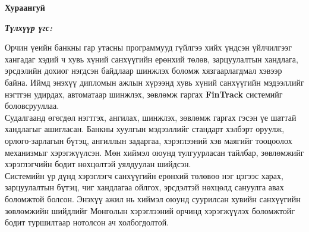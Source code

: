 

\begin{center}
{\scshape\Large \univname\par}
{\scshape\large \facname\par}\vspace{0.5cm}
{\huge\textbf{{Хураангуй}} \par}
\bigskip
{\Large{\ttitle} \par}
\bigskip

{\normalsize \shortname \par}
\addressname
\end{center}

\textit{\textbf{Түлхүүр үгс: \keywordnames}}
\bigskip

Орчин үеийн банкны гар утасны программууд гүйлгээ хийх үндсэн үйлчилгээг хангадаг хэдий ч хувь хүний санхүүгийн ерөнхий төлөв, зарцуулалтын хандлага, эрсдэлийн дохиог нэгдсэн байдлаар шинжлэх боломж хязгаарлагдмал хэвээр байна. Иймд энэхүү дипломын ажлын хүрээнд хувь хүний санхүүгийн мэдээллийг нэгтгэн удирдах, автоматаар шинжлэх, зөвлөмж гаргах \textbf{FinTrack} системийг боловсрууллаа.\\

Судалгаанд өгөгдөл нэгтгэх, ангилах, шинжлэх, зөвлөмж гаргах гэсэн үе шаттай хандлагыг ашигласан. Банкны хуулгын мэдээллийг стандарт хэлбэрт оруулж, орлого-зарлагын бүтэц, ангиллын задаргаа, хэрэглээний хэв маягийг тооцоолох механизмыг хэрэгжүүлсэн. Мөн хиймэл оюунд тулгуурласан тайлбар, зөвлөмжийг хэрэглэгчийн бодит нөхцөлтэй уялдуулан шийдсэн.\\

Системийн үр дүнд хэрэглэгч санхүүгийн ерөнхий төлөвөө нэг цэгээс харах, зарцуулалтын бүтэц, чиг хандлагаа ойлгох, эрсдэлтэй нөхцөлд сануулга авах боломжтой болсон. Энэхүү ажил нь хиймэл оюунд суурилсан хувийн санхүүгийн зөвлөмжийн шийдлийг Монголын хэрэглээний орчинд хэрэгжүүлэх боломжтойг бодит туршилтаар нотолсон ач холбогдолтой.
